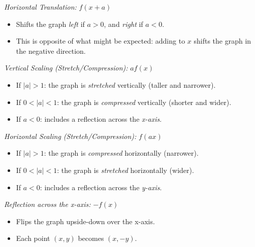 \emph{Horizontal Translation:} \( f(x + a) \)

\begin{itemize}

	\item Shifts the graph \emph{left} if \( a > 0 \), and \emph{right} if \( a < 0 \).

	\item This is opposite of what might be expected: adding to \(x\) shifts the graph in the negative 
	      direction.

\end{itemize}

\emph{Vertical Scaling (Stretch/Compression):} \( a f(x) \)

\begin{itemize}
	
	\item If \( |a| > 1 \): the graph is \emph{stretched} vertically (taller and narrower).
	
	\item If \( 0 < |a| < 1 \): the graph is \emph{compressed} vertically (shorter and wider).
	
	\item If \( a < 0 \): includes a reflection across the \emph{x-axis}.

\end{itemize}

\emph{Horizontal Scaling (Stretch/Compression):} \( f(a x) \)

\begin{itemize}

	\item If \( |a| > 1 \): the graph is \emph{compressed} horizontally (narrower).

	\item If \( 0 < |a| < 1 \): the graph is \emph{stretched} horizontally (wider).

	\item If \( a < 0 \): includes a reflection across the \emph{y-axis}.

\end{itemize}

\emph{Reflection across the x-axis:} \( -f(x) \)
	
\begin{itemize}

	\item Flips the graph upside-down over the x-axis.

	\item Each point \( (x, y) \) becomes \( (x, -y) \).

\end{itemize}

